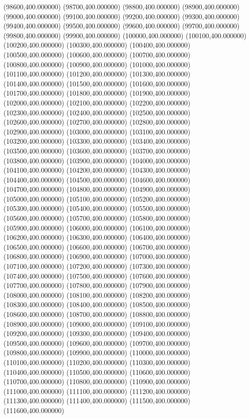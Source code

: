 (98600,400.000000)
(98700,400.000000)
(98800,400.000000)
(98900,400.000000)
(99000,400.000000)
(99100,400.000000)
(99200,400.000000)
(99300,400.000000)
(99400,400.000000)
(99500,400.000000)
(99600,400.000000)
(99700,400.000000)
(99800,400.000000)
(99900,400.000000)
(100000,400.000000)
(100100,400.000000)
(100200,400.000000)
(100300,400.000000)
(100400,400.000000)
(100500,400.000000)
(100600,400.000000)
(100700,400.000000)
(100800,400.000000)
(100900,400.000000)
(101000,400.000000)
(101100,400.000000)
(101200,400.000000)
(101300,400.000000)
(101400,400.000000)
(101500,400.000000)
(101600,400.000000)
(101700,400.000000)
(101800,400.000000)
(101900,400.000000)
(102000,400.000000)
(102100,400.000000)
(102200,400.000000)
(102300,400.000000)
(102400,400.000000)
(102500,400.000000)
(102600,400.000000)
(102700,400.000000)
(102800,400.000000)
(102900,400.000000)
(103000,400.000000)
(103100,400.000000)
(103200,400.000000)
(103300,400.000000)
(103400,400.000000)
(103500,400.000000)
(103600,400.000000)
(103700,400.000000)
(103800,400.000000)
(103900,400.000000)
(104000,400.000000)
(104100,400.000000)
(104200,400.000000)
(104300,400.000000)
(104400,400.000000)
(104500,400.000000)
(104600,400.000000)
(104700,400.000000)
(104800,400.000000)
(104900,400.000000)
(105000,400.000000)
(105100,400.000000)
(105200,400.000000)
(105300,400.000000)
(105400,400.000000)
(105500,400.000000)
(105600,400.000000)
(105700,400.000000)
(105800,400.000000)
(105900,400.000000)
(106000,400.000000)
(106100,400.000000)
(106200,400.000000)
(106300,400.000000)
(106400,400.000000)
(106500,400.000000)
(106600,400.000000)
(106700,400.000000)
(106800,400.000000)
(106900,400.000000)
(107000,400.000000)
(107100,400.000000)
(107200,400.000000)
(107300,400.000000)
(107400,400.000000)
(107500,400.000000)
(107600,400.000000)
(107700,400.000000)
(107800,400.000000)
(107900,400.000000)
(108000,400.000000)
(108100,400.000000)
(108200,400.000000)
(108300,400.000000)
(108400,400.000000)
(108500,400.000000)
(108600,400.000000)
(108700,400.000000)
(108800,400.000000)
(108900,400.000000)
(109000,400.000000)
(109100,400.000000)
(109200,400.000000)
(109300,400.000000)
(109400,400.000000)
(109500,400.000000)
(109600,400.000000)
(109700,400.000000)
(109800,400.000000)
(109900,400.000000)
(110000,400.000000)
(110100,400.000000)
(110200,400.000000)
(110300,400.000000)
(110400,400.000000)
(110500,400.000000)
(110600,400.000000)
(110700,400.000000)
(110800,400.000000)
(110900,400.000000)
(111000,400.000000)
(111100,400.000000)
(111200,400.000000)
(111300,400.000000)
(111400,400.000000)
(111500,400.000000)
(111600,400.000000)
